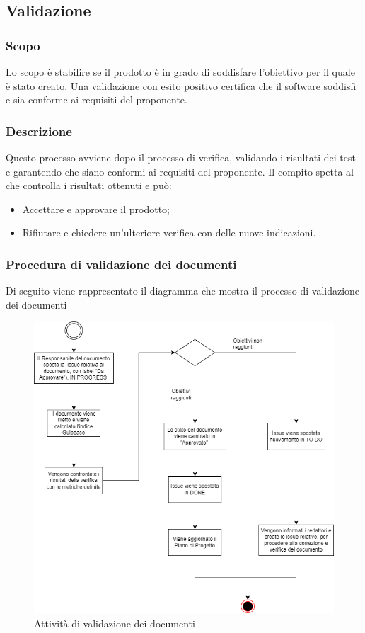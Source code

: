 \subsection{Validazione}
\subsubsection{Scopo}
Lo scopo è stabilire se il prodotto è in grado di soddisfare l'obiettivo per il quale è stato creato. Una validazione con esito positivo certifica che il software soddisfi e sia conforme ai requisiti del proponente.

\subsubsection{Descrizione}
Questo processo avviene dopo il processo di verifica, validando i risultati dei test e garantendo che siano conformi ai requisiti del proponente. Il compito spetta al \RE che controlla i risultati ottenuti e può:
\begin{itemize}
\item Accettare e approvare il prodotto;
\item Rifiutare e chiedere un'ulteriore verifica con delle nuove indicazioni.
\end{itemize}

\pagebreak

\subsubsection{Procedura di validazione dei documenti}
Di seguito viene rappresentato il diagramma che mostra il processo di validazione dei documenti
\begin{figure}[!h]
\centering
\includegraphics[scale=0.5]{Contenuto/Immagini/valid-documenti.png}
\caption{Attività di validazione dei documenti}
\end{figure}

